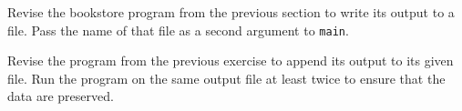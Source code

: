 %
%
\begin{question}
Revise the bookstore program from the previous section to
write its output to a file. Pass the name of that file as a second argument to \verb|main|.
\end{question}

\begin{question}
Revise the program from the previous exercise to append its
output to its given file. Run the program on the same output file at least
twice to ensure that the data are preserved.
\end{question}
